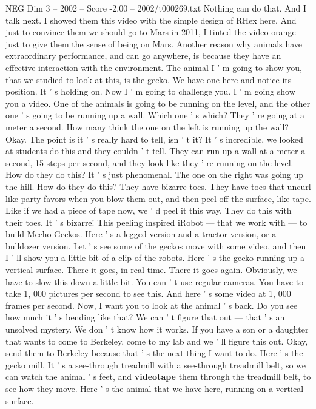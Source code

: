 \begin{textsample}{NEG Dim 3 – 2002 – Score -2.00 – 2002/t000269.txt}
Nothing can do that.
And I talk next.
I showed them this video with the simple design of RHex here.
And just to convince them we should go to Mars in 2011, I tinted the video orange just to give them the sense of being on Mars.
Another reason why animals have extraordinary performance, and can go anywhere, is because they have an effective interaction with the environment.
The animal I ' m going to show you, that we studied to look at this, is the gecko.
We have one here and notice its position.
It ' s holding on.
Now I ' m going to challenge you.
I ' m going show you a video.
One of the animals is going to be running on the level, and the other one ' s going to be running up a wall.
Which one ' s which?
They ' re going at a meter a second.
How many think the one on the left is running up the wall?
Okay.
The point is it ' s really hard to tell, isn ' t it?
It ' s incredible, we looked at students do this and they couldn ' t tell.
They can run up a wall at a meter a second, 15 steps per second, and they look like they ' re running on the level.
How do they do this?
It ' s just phenomenal.
The one on the right was going up the hill.
How do they do this?
They have bizarre toes.
They have toes that uncurl like party favors when you blow them out, and then peel off the surface, like tape.
Like if we had a piece of tape now, we ' d peel it this way.
They do this with their toes.
It ' s bizarre!
This peeling inspired iRobot — that we work with — to build Mecho-Geckos.
Here ' s a legged version and a tractor version, or a bulldozer version.
Let ' s see some of the geckos move with some video, and then I ' ll show you a little bit of a clip of the robots.
Here ' s the gecko running up a vertical surface.
There it goes, in real time.
There it goes again.
Obviously, we have to slow this down a little bit.
You can ' t use regular cameras.
You have to take 1, 000 pictures per second to see this.
And here ' s some video at 1, 000 frames per second.
Now, I want you to look at the animal ' s back.
Do you see how much it ' s bending like that?
We can ' t figure that out — that ' s an unsolved mystery.
We don ' t know how it works.
If you have a son or a daughter that wants to come to Berkeley, come to my lab and we ' ll figure this out.
Okay, send them to Berkeley because that ' s the next thing I want to do.
Here ' s the gecko mill.
It ' s a see-through treadmill with a see-through treadmill belt, so we can watch the animal ' s feet, and \textbf{videotape} them through the treadmill belt, to see how they move.
Here ' s the animal that we have here, running on a vertical surface.

\end{textsample}
